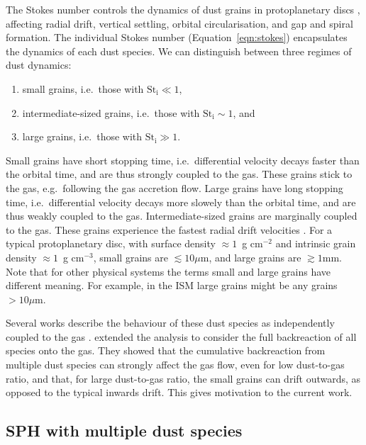 \documentclass[fleqn,usenatbib]{mnras}
\begin{document}
The Stokes number controls the dynamics of dust grains in protoplanetary discs
\citep{Weidenschilling1977MNRAS.180...57W, Takeuchi2002ApJ...581.1344T},
affecting radial drift, vertical settling, orbital circularisation, and gap and
spiral formation. The individual Stokes number (Equation~\ref{eqn:stokes})
encapsulates the dynamics of each dust species. We can distinguish between three
regimes of dust dynamics:
%
\begin{enumerate}
   \item small grains, i.e.\ those with \(\mathrm{St_i} \ll 1\),
   \item intermediate-sized grains, i.e.\ those with \(\mathrm{St_i} \sim 1\),
      and
   \item large grains, i.e.\ those with \(\mathrm{St_i} \gg 1\).
\end{enumerate}
%
Small grains have short stopping time, i.e.\ differential velocity decays faster
than the orbital time, and are thus strongly coupled to the gas. These grains
stick to the gas, e.g.\ following the gas accretion flow. Large grains have long
stopping time, i.e.\ differential velocity decays more slowely than the orbital
time, and are thus weakly coupled to the gas. Intermediate-sized grains are
marginally coupled to the gas. These grains experience the fastest radial drift
velocities \citep{Takeuchi2002ApJ...581.1344T,Ayliffe2012MNRAS.423.1450A}. For a
typical protoplanetary disc, with surface density \(\approx 1\)~g cm\({}^{-2}\)
and intrinsic grain density \(\approx 1\)~g cm\({}^{-3}\), small grains are
\(\lesssim 10 \mu\mathrm{m}\), and large grains are \(\gtrsim 1 \mathrm{mm}\).
Note that for other physical systems the terms small and large grains have
different meaning. For example, in the ISM large grains might be any grains \(>
10 \mu\mathrm{m}\).

Several works describe the behaviour of these dust species as independently
coupled to the gas \citep{Nakagawa1986Icar...67..375N,
Dipierro2017MNRAS.469.1932D, Kanagawa2017ApJ...844..142K}.
\citet{Dipierro2018MNRAS.479.4187D} extended the analysis to consider the full
backreaction of all species onto the gas. They showed that the cumulative
backreaction from multiple dust species can strongly affect the gas flow, even
for low dust-to-gas ratio, and that, for large dust-to-gas ratio, the small
grains can drift outwards, as opposed to the typical inwards drift. This gives
motivation to the current work.


\subsection{SPH with multiple dust species}%
\label{subsec:sph}
\end{document}
